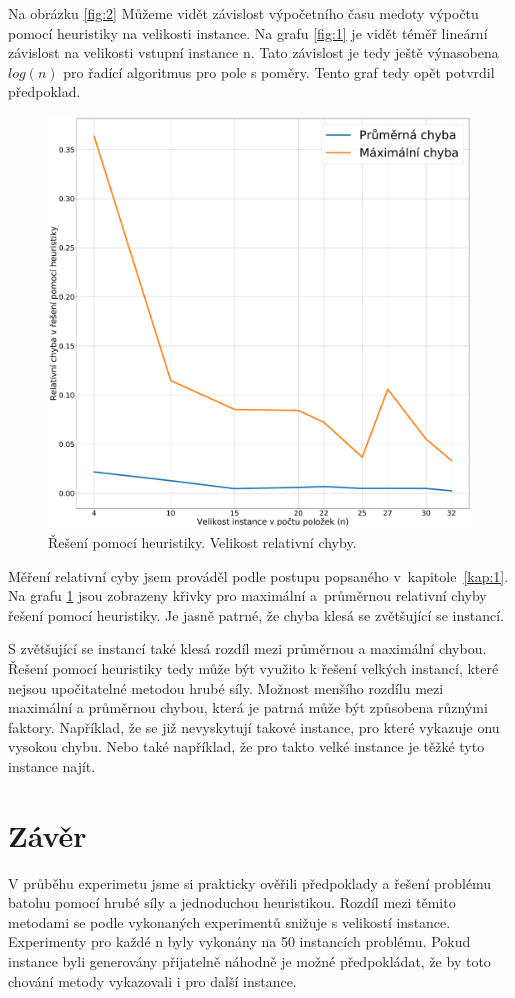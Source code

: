 \documentclass[11pt]{article}
\begin{document}
Na obrázku \ref{fig:2} Můžeme vidět závislost výpočetního času medoty výpočtu pomocí heuristiky na velikosti instance. Na grafu \ref{fig:1} je vidět  téměř lineární závislost na velikosti vstupní instance n. Tato závislost je tedy ještě výnasobena $log(n)$ pro řadící algoritmus pro pole s poměry. Tento graf tedy opět potvrdil předpoklad.
\begin{figure}\centering
	\includegraphics[scale=0.25]{img/3}
 	\caption[3]{Řešení pomocí heuristiky. Velikost relativní chyby.}\label{fig:3}
 \end{figure} 	
Měření relativní cyby jsem prováděl podle postupu popsaného v~kapitole~\ref{kap:1}. Na grafu \ref{fig:3} jsou zobrazeny křivky pro maximální a~průměrnou relativní chyby řešení pomocí heuristiky. Je jasně patrné, že chyba klesá se zvětšující se instancí. 

S zvětšující se instancí také klesá rozdíl mezi průměrnou a maximální chybou. Řešení pomocí heuristiky tedy může být využito k řešení velkých instancí, které nejsou upočitatelné metodou hrubé síly. Možnost menšího rozdílu mezi maximální a průměrnou chybou, která je patrná může být způsobena různými faktory. Například, že se již nevyskytují takové instance, pro které vykazuje onu vysokou chybu. Nebo také například, že pro takto velké instance je těžké tyto instance najít. 

 
\section{Závěr}
V průběhu experimetu jsme si prakticky ověřili předpoklady a řešení problému batohu pomocí hrubé síly a jednoduchou heuristikou. Rozdíl mezi těmito metodami se podle vykonaných experimentů snižuje s velikostí instance. Experimenty pro každé n byly vykonány na 50 instancích problému. Pokud instance byli generovány přijatelně náhodně je možné předpokládat, že by toto chování metody vykazovali i pro další instance. 
\end{document}
